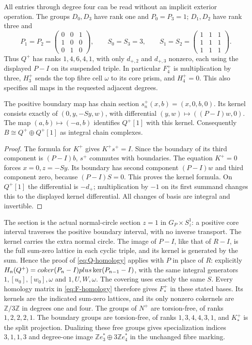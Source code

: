 All entries through degree four can be read without an implicit
exterior operation. The groups $D_0,D_3$ have rank one and
$P_0=P_3=1$; $D_1,D_2$ have rank three and
\[
 P_1=P_2=\begin{pmatrix}0&0&1\\1&0&0\\0&1&0\end{pmatrix},
 \qquad S_0=S_3=3,\qquad
 S_1=S_2=\begin{pmatrix}1&1&1\\1&1&1\\1&1&1\end{pmatrix}.
\]
Thus $Q^+$ has ranks $1,4,6,4,1$, with only $d_{+,2}$ and
$d_{+,3}$ nonzero, each using the displayed $P-I$ on its suspended
triple. In particular $F^+_4$ is multiplication by three, $H^+_3$
sends the top fibre cell $\omega$ to its core prism, and $H^+_4=0$.
This also specifies all maps in the requested adjacent degrees.

\begin{proposition}\label{prop:positive-splitting}
The positive boundary map has chain section
$s^+_n(x,b)=(x,0,b,0)$. Its kernel consists exactly of
$(0,y,-Sy,w)$, with differential $(y,w)\mapsto((P-I)w,0)$.
The map $(a,b)\mapsto(-a,b)$ identifies $Q^+[1]$ with this kernel.
Consequently $B\cong Q^+\oplus Q^+[1]$ as integral chain complexes.
\end{proposition}
\begin{proof}
The formula for $K^+$ gives $K^+s^+=I$. Since the boundary of
its third component is $(P-I)b$, $s^+$ commutes with boundaries.
The equation $K^+=0$ forces $x=0,z=-Sy$. Its boundary has
second component $(P-I)w$ and third component zero, because
$(P-I)S=0$. This proves the kernel formula. On $Q^+[1]$ the
differential is $-d_+$; multiplication by $-1$ on its first
summand changes this to the displayed kernel differential.
All changes of basis are integral and invertible.
\end{proof}

The section is the actual normal-circle section $z=1$ in
$G_P\times S^1_z$: a positive core interval traverses the positive
boundary interval, with no inverse transport. The kernel carries
the extra normal circle. The image of $P-I$, like that of $R-I$,
is the full sum-zero lattice in each cyclic triple, and its kernel
is generated by the sum. Hence the proof of
\eqref{eq:Q-homology} applies with $P$ in place of $R$: explicitly
$H_n(Q^+)=coker(P_n-I)plus\ker(P_{n-1}-I)$, with the same
integral generators $1,[u_0],[w_0],\omega$ and $1,U,W,\omega$.
The covering uses exactly the same $S$. Every homology matrix in
\eqref{eq:F-homology} therefore gives $F^+_*$ in these stated bases.
Its kernels are the indicated sum-zero lattices, and its only
nonzero cokernels are $\mathbb Z/3\mathbb Z$ in degrees one and four.
The groups of $N^+$ are torsion-free, of ranks $1,2,2,2,1$.
The boundary groups are torsion-free, of ranks $1,3,4,4,3,1$,
and $K^+_*$ is the split projection. Dualizing these free groups
gives specialization indices $3,1,1,3$ and degree-one image
$\mathbb Ze_3^*\oplus3\mathbb Ze_4^*$ in the unchanged fibre marking.

